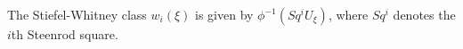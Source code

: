 The Stiefel-Whitney class $w_i(\xi)$ is given by $\phi^{-1}(Sq^iU_\xi)$, where $Sq^i$ denotes the $i$th Steenrod square.
